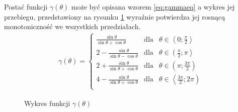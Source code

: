      Postać funkcji $\gamma\left(\theta\right)$ może być opisana wzorem \ref{eq:gammaeq} a wykres jej przebiegu, przedstawiony na rysunku \ref{fig:gamma} wyraźnie potwierdza jej rosnącą monotoniczność we wszystkich przedziałach.
        \begin{align}\label{eq:gammaeq}
        	\gamma\left(
        		\theta
        	\right) = 
        		\left\{
        			\begin{array}{lcl}
        				\frac{
        					\sin\theta
        				}{
							\sin\theta + \cos\theta        			
        				} & 
        					\text{dla} &
        					\theta \in \left\langle
        						0;
        						\frac{
        							\pi
        						}{
									2        						
        						}
        					\right\rangle\\
        				2
        				- \frac{
        					\sin\theta
        				}{
							\sin\theta - \cos\theta        			
        				} & 
        					\text{dla} &
        					\theta \in \left(
        						\frac{
        							\pi
        						}{
									2        						
        						};
        						\pi
        					\right\rangle\\
        				2
        				+ \frac{
        					\sin\theta
        				}{
							\sin\theta + \cos\theta        			
        				} & 
        					\text{dla} &
        					\theta \in \left(
        						\pi;
        						\frac{
        							3\pi
        						}{
									2        						
        						}
        					\right)\\
        				4
        				- \frac{
        					\sin\theta
        				}{
							\sin\theta + \cos\theta        			
        				} & 
        					\text{dla} &
        					\theta \in \left\langle
        						\frac{
        							3\pi
        						}{
									2        						
        						};
        						2\pi
        					\right)\\
        			\end{array}
        		\right.      		
        \end{align}
        \begin{figure}[h!]
        	\begin{center}
    			
    			\caption{Wykres funkcji $\gamma\left(\theta\right)$}\label{fig:gamma}
    	\end{center}
    	\mysource
    	\end{figure}\vspace{-8 mm}\\
       
